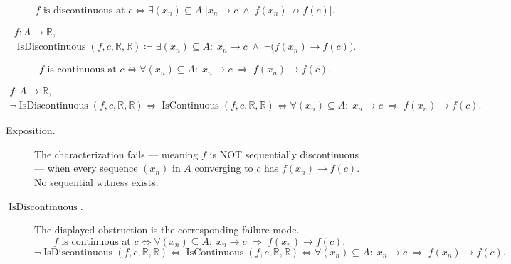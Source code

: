 \begin{remark*}
\[
f \text{ is discontinuous at } c \Longleftrightarrow
\exists (x_n)\subseteq A \;\bigl[x_n \to c \;\land\; f(x_n) \not\to f(c)\bigr].
\]
\end{remark*}

\begin{remark*}
\[
\begin{aligned}
  f\colon A\to\mathbb{R},\\
\operatorname{IsDiscontinuous}(f,c,\mathbb{R},\mathbb{R}) \coloneqq \exists (x_n)\subseteq A:\; x_n\to c \;\land\; \neg\bigl(f(x_n)\to f(c)\bigr).
\end{aligned}
\]
\end{remark*}

\begin{remark*}
\[
f \text{ is continuous at } c \Longleftrightarrow
\forall (x_n)\subseteq A:\; x_n\to c \;\Rightarrow\; f(x_n)\to f(c).
\]
\end{remark*}

\begin{remark*}
\[
\begin{aligned}
  f\colon A\to\mathbb{R},\\
\neg \operatorname{IsDiscontinuous}(f,c,\mathbb{R},\mathbb{R})
\Longleftrightarrow
\operatorname{IsContinuous}(f,c,\mathbb{R},\mathbb{R})
\Longleftrightarrow
\forall (x_n)\subseteq A:\; x_n\to c \;\Rightarrow\; f(x_n)\to f(c).
\end{aligned}
\]
\end{remark*}

\begin{remark*}
\begin{description}
  \item[Exposition.]
The characterization fails --- meaning $f$ is NOT sequentially discontinuous --- when every sequence $(x_n)$ in $A$ converging to $c$ has $f(x_n) \to f(c)$. No sequential witness exists.


  \item[\(\operatorname{IsDiscontinuous}.\)]
  The displayed obstruction is the corresponding failure mode.
  \[
f \text{ is continuous at } c \Longleftrightarrow
\forall (x_n)\subseteq A:\; x_n\to c \;\Rightarrow\; f(x_n)\to f(c).
  \]
  \[
\neg \operatorname{IsDiscontinuous}(f,c,\mathbb{R},\mathbb{R})
\Longleftrightarrow
\operatorname{IsContinuous}(f,c,\mathbb{R},\mathbb{R})
\Longleftrightarrow
\forall (x_n)\subseteq A:\; x_n\to c \;\Rightarrow\; f(x_n)\to f(c).
  \]
\end{description}
\end{remark*}

